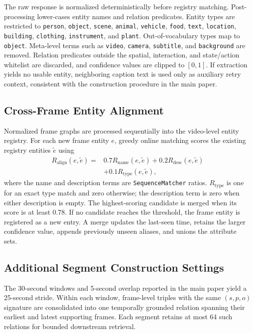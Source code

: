 \documentclass[11pt]{article}
\begin{document}
The raw response is normalized deterministically before registry matching.
Post-processing lower-cases entity names and relation predicates.
Entity types are restricted to \texttt{person}, \texttt{object}, \texttt{scene}, \texttt{animal}, \texttt{vehicle}, \texttt{food}, \texttt{text}, \texttt{location}, \texttt{building}, \texttt{clothing}, \texttt{instrument}, and \texttt{plant}.
Out-of-vocabulary types map to \texttt{object}.
Meta-level terms such as \texttt{video}, \texttt{camera}, \texttt{subtitle}, and \texttt{background} are removed.
Relation predicates outside the spatial, interaction, and state/action whitelist are discarded, and confidence values are clipped to $[0,1]$.
If extraction yields no usable entity, neighboring caption text is used only as auxiliary retry context, consistent with the construction procedure in the main paper.

\subsection{Cross-Frame Entity Alignment}

Normalized frame graphs are processed sequentially into the video-level entity registry.
For each new frame entity $e$, greedy online matching scores the existing registry entities $\tilde e$ using
\begin{equation}
  \begin{split}
  R_{\mathrm{align}}(e,\tilde e)
  ={}&0.7R_{\mathrm{name}}(e,\tilde e)
  +0.2R_{\mathrm{desc}}(e,\tilde e)\\
  &+0.1R_{\mathrm{type}}(e,\tilde e),
  \end{split}
  \label{eq:supp-alignment}
\end{equation}
where the name and description terms are \texttt{SequenceMatcher} ratios.
$R_{\mathrm{type}}$ is one for an exact type match and zero otherwise; the description term is zero when either description is empty.
The highest-scoring candidate is merged when its score is at least $0.78$.
If no candidate reaches the threshold, the frame entity is registered as a new entry.
A merge updates the last-seen time, retains the larger confidence value, appends previously unseen aliases, and unions the attribute sets.

\subsection{Additional Segment Construction Settings}

The 30-second windows and 5-second overlap reported in the main paper yield a 25-second stride.
Within each window, frame-level triples with the same $(s,p,o)$ signature are consolidated into one temporally grounded relation spanning their earliest and latest supporting frames.
Each segment retains at most 64 such relations for bounded downstream retrieval.
\end{document}
